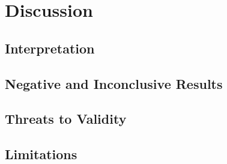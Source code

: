 \chapter{Discussion}\label{ch:discussion}
\section{Interpretation}\label{sec:disc:interpretation}
\section{Negative and Inconclusive Results}\label{sec:disc:negative}
\section{Threats to Validity}\label{sec:disc:threats}
\section{Limitations}\label{sec:disc:limitations}

